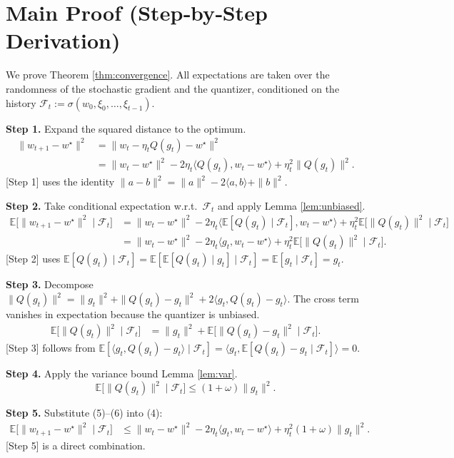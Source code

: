 \documentclass{article}
\begin{document}
\section*{Main Proof (Step‑by‑Step Derivation)}
We prove Theorem \ref{thm:convergence}.  
All expectations are taken over the randomness of the stochastic gradient and the quantizer, conditioned on the history $\mathcal{F}_t:=\sigma(w_0,\xi_0,\dots,\xi_{t-1})$.

\noindent\textbf{Step 1.} Expand the squared distance to the optimum.
\begin{align}
\|w_{t+1}-w^\star\|^2
&= \big\|w_t-\eta_t Q(g_t)-w^\star\big\|^2 \nonumber\\
&= \|w_t-w^\star\|^2-2\eta_t\langle Q(g_t),w_t-w^\star\rangle+\eta_t^2\|Q(g_t)\|^2 .
\tag{3}
\end{align}
[Step 1] uses the identity $\|a-b\|^2=\|a\|^2-2\langle a,b\rangle+\|b\|^2$.

\noindent\textbf{Step 2.} Take conditional expectation w.r.t.\ $\mathcal{F}_t$ and apply Lemma \ref{lem:unbiased}.
\begin{align}
\mathbb{E}\!\big[\|w_{t+1}-w^\star\|^2\mid\mathcal{F}_t\big]
&= \|w_t-w^\star\|^2-2\eta_t\langle \mathbb{E}[Q(g_t)\mid\mathcal{F}_t],w_t-w^\star\rangle
   +\eta_t^2\mathbb{E}\!\big[\|Q(g_t)\|^2\mid\mathcal{F}_t\big] \nonumber\\
&= \|w_t-w^\star\|^2-2\eta_t\langle g_t,w_t-w^\star\rangle
   +\eta_t^2\mathbb{E}\!\big[\|Q(g_t)\|^2\mid\mathcal{F}_t\big] .
\tag{4}
\end{align}
[Step 2] uses $\mathbb{E}[Q(g_t)\mid\mathcal{F}_t]=\mathbb{E}[\mathbb{E}[Q(g_t)\mid g_t]\mid\mathcal{F}_t]=\mathbb{E}[g_t\mid\mathcal{F}_t]=g_t$.

\noindent\textbf{Step 3.} Decompose $\|Q(g_t)\|^2=\|g_t\|^2+\|Q(g_t)-g_t\|^2+2\langle g_t,Q(g_t)-g_t\rangle$. The cross term vanishes in expectation because the quantizer is unbiased.
\begin{align}
\mathbb{E}\!\big[\|Q(g_t)\|^2\mid\mathcal{F}_t\big]
&= \|g_t\|^2+\mathbb{E}\!\big[\|Q(g_t)-g_t\|^2\mid\mathcal{F}_t\big] .
\tag{5}
\end{align}
[Step 3] follows from $\mathbb{E}[\langle g_t,Q(g_t)-g_t\rangle\mid\mathcal{F}_t]=\langle g_t,\mathbb{E}[Q(g_t)-g_t\mid\mathcal{F}_t]\rangle=0$.

\noindent\textbf{Step 4.} Apply the variance bound Lemma \ref{lem:var}.
\[
\mathbb{E}\!\big[\|Q(g_t)\|^2\mid\mathcal{F}_t\big]\le (1+\omega)\|g_t\|^2 .
\tag{6}
\]

\noindent\textbf{Step 5.} Substitute (5)–(6) into (4):
\begin{align}
\mathbb{E}\!\big[\|w_{t+1}-w^\star\|^2\mid\mathcal{F}_t\big]
&\le \|w_t-w^\star\|^2-2\eta_t\langle g_t,w_t-w^\star\rangle
   +\eta_t^2(1+\omega)\|g_t\|^2 .
\tag{7}
\end{align}
[Step 5] is a direct combination.
\end{document}
